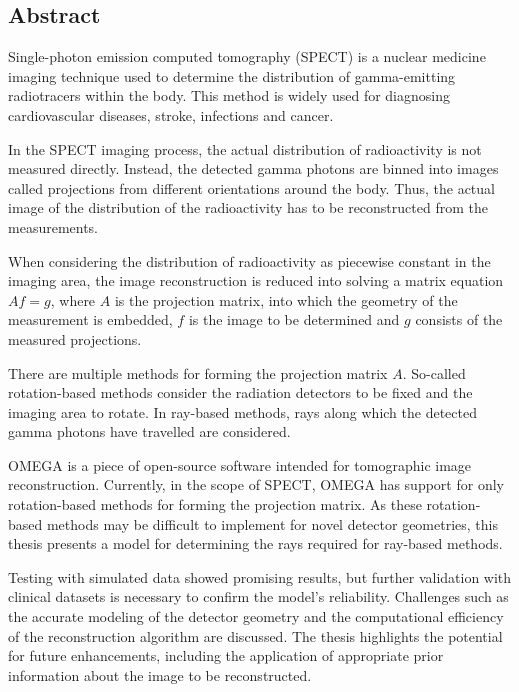 \begin{titlepage}
    \section*{Abstract}
    Single-photon emission computed tomography (SPECT) is a nuclear medicine imaging technique used to determine the distribution of gamma-emitting radiotracers within the body. This method is widely used for diagnosing cardiovascular diseases, stroke, infections and cancer.
    
    In the SPECT imaging process, the actual distribution of radioactivity is not measured directly. Instead, the detected gamma photons are binned into images called projections from different orientations around the body. Thus, the actual image of the distribution of the radioactivity has to be reconstructed from the measurements.
    
    When considering the distribution of radioactivity as piecewise constant in the imaging area, the image reconstruction is reduced into solving a matrix equation $Af=g$, where $A$ is the projection matrix, into which the geometry of the measurement is embedded, $f$ is the image to be determined and $g$ consists of the measured projections.
    
    There are multiple methods for forming the projection matrix $A$. So-called rotation-based methods consider the radiation detectors to be fixed and the imaging area to rotate. In ray-based methods, rays along which the detected gamma photons have travelled are considered.
    
    OMEGA is a piece of open-source software intended for tomographic image reconstruction. Currently, in the scope of SPECT, OMEGA has support for only rotation-based methods for forming the projection matrix. As these rotation-based methods may be difficult to implement for novel detector geometries, this thesis presents a model for determining the rays required for ray-based methods. 
    
    Testing with simulated data showed promising results, but further validation with clinical datasets is necessary to confirm the model's reliability. Challenges such as the accurate modeling of the detector geometry and the computational efficiency of the reconstruction algorithm are discussed. The thesis highlights the potential for future enhancements, including the application of appropriate prior information about the image to be reconstructed.
\end{titlepage}